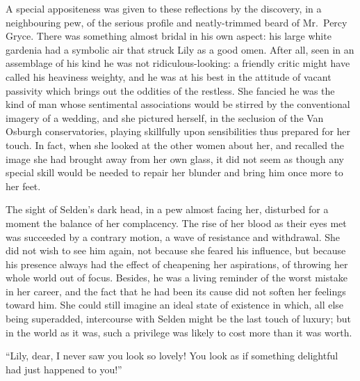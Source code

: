\documentclass[12pt,a4paper]{book}
\begin{document}
A special appositeness was given to these reflections by the
discovery, in a neighbouring pew, of the serious profile and
neatly-trimmed beard of Mr.\ Percy Gryce. There was something
almost bridal in his own aspect: his large white gardenia had a
symbolic air that struck Lily as a good omen. After all, seen in
an assemblage of his kind he was not ridiculous-looking: a
friendly critic might have called his heaviness weighty, and he
was at his best in the attitude of vacant passivity which brings
out the oddities of the restless. She fancied he was the kind of
man whose sentimental associations would be stirred by the
conventional imagery of a wedding, and she pictured herself, in
the seclusion of the Van Osburgh conservatories, playing
skillfully upon sensibilities thus prepared for her touch. In
fact, when she looked at the other women about her, and recalled
the image she had brought away from her own glass, it did not
seem as though any special skill would be needed to repair her
blunder and bring him once more to her feet.





The sight of Selden's dark head, in a pew almost facing her,
disturbed for a moment the balance of her complacency. The rise
of her blood as their eyes met was succeeded by a contrary
motion, a wave of resistance and withdrawal. She did not wish to
see him again, not because she feared his influence, but because
his presence always had the effect of cheapening her aspirations,
of throwing her whole world out of focus. Besides, he was a
living reminder of the worst mistake in her career, and the fact
that he had been its cause did not soften her feelings toward
him. She could still imagine an ideal state of existence in
which, all else being superadded, intercourse with Selden might
be the last touch of luxury; but in the world as it was, such a
privilege was likely to cost more than it was worth.





``Lily, dear, I never saw you look so lovely! You look as if
something delightful had just happened to you!''
\end{document}
